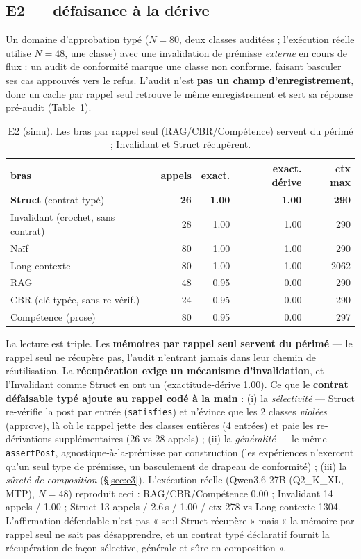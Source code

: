 \documentclass[11pt]{article}
\begin{document}
\subsection{E2 --- défaisance à la dérive}
Un domaine d'approbation typé ($N{=}80$, deux classes auditées ; l'exécution réelle utilise $N{=}48$, une classe)
avec une invalidation de prémisse \emph{externe} en cours de flux : un audit de conformité marque une classe non
conforme, faisant basculer ses cas approuvés vers le refus. L'audit n'est \textbf{pas un champ d'enregistrement},
donc un cache par rappel seul retrouve le même enregistrement et sert sa réponse pré-audit (Table~\ref{tab:e2}).

\begin{table}[h]\centering
\begin{tabular}{lrrrr}
\toprule
bras & appels & exact. & \textbf{exact. dérive} & ctx max \\
\midrule
\textbf{Struct} (contrat typé) & \textbf{26} & \textbf{1.00} & \textbf{1.00} & \textbf{290} \\
Invalidant (crochet, sans contrat) & 28 & 1.00 & 1.00 & 290 \\
Naïf & 80 & 1.00 & 1.00 & 290 \\
Long-contexte & 80 & 1.00 & 1.00 & 2062 \\
RAG & 48 & 0.95 & 0.00 & 290 \\
CBR (clé typée, sans re-vérif.) & 24 & 0.95 & 0.00 & 290 \\
Compétence (prose) & 80 & 0.95 & 0.00 & 297 \\
\bottomrule
\end{tabular}
\caption{E2 (simu). Les bras par rappel seul (RAG/CBR/Compétence) servent du périmé ; Invalidant et Struct récupèrent.}
\label{tab:e2}
\end{table}

La lecture est triple. Les \textbf{mémoires par rappel seul servent du périmé} --- le rappel seul ne récupère pas,
l'audit n'entrant jamais dans leur chemin de réutilisation. La \textbf{récupération exige un mécanisme
d'invalidation}, et l'Invalidant comme Struct en ont un (exactitude-dérive 1.00). Ce que le \textbf{contrat
défaisable typé ajoute au rappel codé à la main} : (i) la \emph{sélectivité} --- Struct re-vérifie la post par
entrée (\texttt{satisfies}) et n'évince que les 2 classes \emph{violées} (approve), là où le rappel jette des
classes entières (4 entrées) et paie les re-dérivations supplémentaires (26 vs 28 appels) ; (ii) la
\emph{généralité} --- le même \texttt{assertPost}, agnostique-à-la-prémisse par construction (les expériences
n'exercent qu'un seul type de prémisse, un basculement de drapeau de conformité) ; (iii) la \emph{sûreté de
composition} (§\ref{sec:e3}). L'exécution réelle (Qwen3.6-27B (Q2\_K\_XL, MTP), $N{=}48$) reproduit ceci :
RAG/CBR/Compétence 0.00 ; Invalidant 14 appels / 1.00 ; Struct 13 appels / 2.6\,s / 1.00 / ctx 278 vs
Long-contexte 1304. L'affirmation défendable n'est pas « seul Struct
récupère » mais « la mémoire par rappel seul ne sait pas désapprendre, et un contrat typé déclaratif fournit la
récupération de façon sélective, générale et sûre en composition ».
\end{document}
